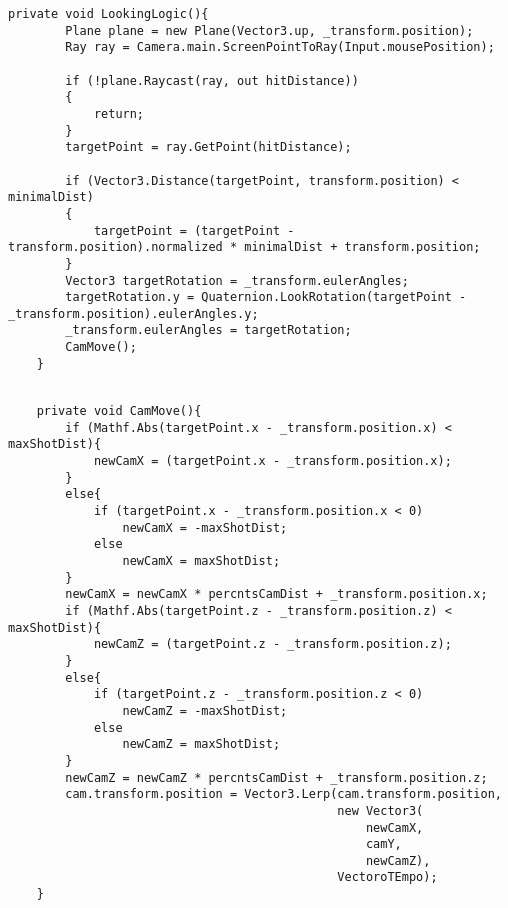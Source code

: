 \documentclass[14pt, titlepage,fleqn,a4paper]{extarticle}
\begin{document}
	 \begin{lstlisting}[caption= Основная функция камеры, label=lst:test]
    private void LookingLogic(){
        Plane plane = new Plane(Vector3.up, _transform.position);
        Ray ray = Camera.main.ScreenPointToRay(Input.mousePosition);

        if (!plane.Raycast(ray, out hitDistance))
        {
            return;
        }
        targetPoint = ray.GetPoint(hitDistance);

        if (Vector3.Distance(targetPoint, transform.position) < minimalDist)
        {
            targetPoint = (targetPoint - transform.position).normalized * minimalDist + transform.position;
        }
        Vector3 targetRotation = _transform.eulerAngles;
        targetRotation.y = Quaternion.LookRotation(targetPoint - _transform.position).eulerAngles.y;
        _transform.eulerAngles = targetRotation;
        CamMove();
    }
    \end{lstlisting}
    \newpage
    \begin{lstlisting}[caption= Функция передвижения камеры, label=lst:test]
    
    private void CamMove(){
        if (Mathf.Abs(targetPoint.x - _transform.position.x) < maxShotDist){
            newCamX = (targetPoint.x - _transform.position.x);
        }
        else{
            if (targetPoint.x - _transform.position.x < 0)
                newCamX = -maxShotDist;
            else
                newCamX = maxShotDist;
        }
        newCamX = newCamX * percntsCamDist + _transform.position.x;
        if (Mathf.Abs(targetPoint.z - _transform.position.z) < maxShotDist){
            newCamZ = (targetPoint.z - _transform.position.z);
        }
        else{
            if (targetPoint.z - _transform.position.z < 0)
                newCamZ = -maxShotDist;
            else
                newCamZ = maxShotDist;
        }
        newCamZ = newCamZ * percntsCamDist + _transform.position.z;
        cam.transform.position = Vector3.Lerp(cam.transform.position,
                                              new Vector3(
                                                  newCamX,
                                                  camY,
                                                  newCamZ),
                                              VectoroTEmpo);
    }
    \end{lstlisting}
    \newpage
\end{document}
